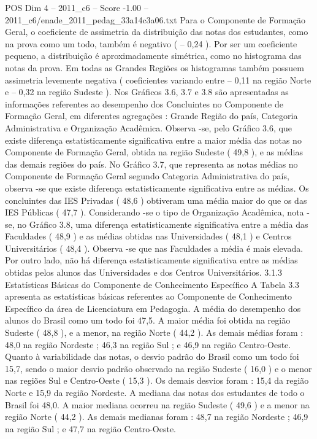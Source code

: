 \begin{textsample}{POS Dim 4 – 2011\_c6 – Score -1.00 – 2011\_c6/enade\_2011\_pedag\_33a14c3a06.txt}
Para o Componente de Formação Geral, o coeficiente de assimetria da distribuição das notas dos estudantes, como na prova como um todo, também é negativo ( – 0,24 ).
Por ser um coeficiente pequeno, a distribuição é aproximadamente simétrica, como no histograma das notas da prova.
Em todas as Grandes Regiões os histogramas também possuem assimetria levemente negativa ( coeficientes variando entre – 0,11 na região Norte e – 0,32 na região Sudeste ).
Nos Gráficos 3.6, 3.7 e 3.8 são apresentadas as informações referentes ao desempenho dos Concluintes no Componente de Formação Geral, em diferentes agregações : Grande Região do país, Categoria Administrativa e Organização Acadêmica.
Observa -se, pelo Gráfico 3.6, que existe diferença estatisticamente significativa entre a maior média das notas no Componente de Formação Geral, obtida na região Sudeste ( 49,8 ), e as médias das demais regiões do país.
No Gráfico 3.7, que representa as notas médias no Componente de Formação Geral segundo Categoria Administrativa do país, observa -se que existe diferença estatisticamente significativa entre as médias.
Os concluintes das IES Privadas ( 48,6 ) obtiveram uma média maior do que os das IES Públicas ( 47,7 ).
Considerando -se o tipo de Organização Acadêmica, nota -se, no Gráfico 3.8, uma diferença estatisticamente significativa entre a média das Faculdades ( 48,9 ) e as médias obtidas nas Universidades ( 48,1 ) e Centros Universitários ( 48,4 ).
Observa -se que nas Faculdades a média é mais elevada.
Por outro lado, não há diferença estatisticamente significativa entre as médias obtidas pelos alunos das Universidades e dos Centros Universitários. 3.1.3 Estatísticas Básicas do Componente de Conhecimento Específico A Tabela 3.3 apresenta as estatísticas básicas referentes ao Componente de Conhecimento Específico da área de Licenciatura em Pedagogia.
A média do desempenho dos alunos do Brasil como um todo foi 47,5.
A maior média foi obtida na região Sudeste ( 48,8 ), e a menor, na região Norte ( 44,2 ).
As demais médias foram : 48,0 na região Nordeste ; 46,3 na região Sul ; e 46,9 na região Centro-Oeste.
Quanto à variabilidade das notas, o desvio padrão do Brasil como um todo foi 15,7, sendo o maior desvio padrão observado na região Sudeste ( 16,0 ) e o menor nas regiões Sul e Centro-Oeste ( 15,3 ).
Os demais desvios foram : 15,4 da região Norte e 15,9 da região Nordeste.
A mediana das notas dos estudantes de todo o Brasil foi 48,0.
A maior mediana ocorreu na região Sudeste ( 49,6 ) e a menor na região Norte ( 44,2 ).
As demais medianas foram : 48,7 na região Nordeste ; 46,9 na região Sul ; e 47,7 na região Centro-Oeste.

\end{textsample}
